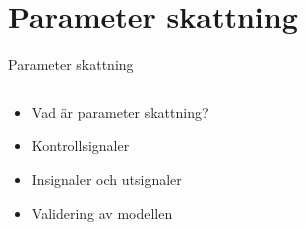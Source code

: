 \documentclass[11pt,aspectratio=169]{beamer}
\begin{document}
\section{Parameter skattning}
\begin{frame}{Parameter skattning}
\begin{columns}
\begin{column}{0.5\textwidth}
\begin{itemize}
\item {} {Vad är parameter skattning?}
\item {} {Kontrollsignaler}
\item {} {Insignaler och utsignaler}
\item {} {Validering av modellen}
\end{itemize}
\end{column}
\begin{column}{0.5\textwidth}




\end{column}
\end{columns}
\end{frame}
\end{document}
